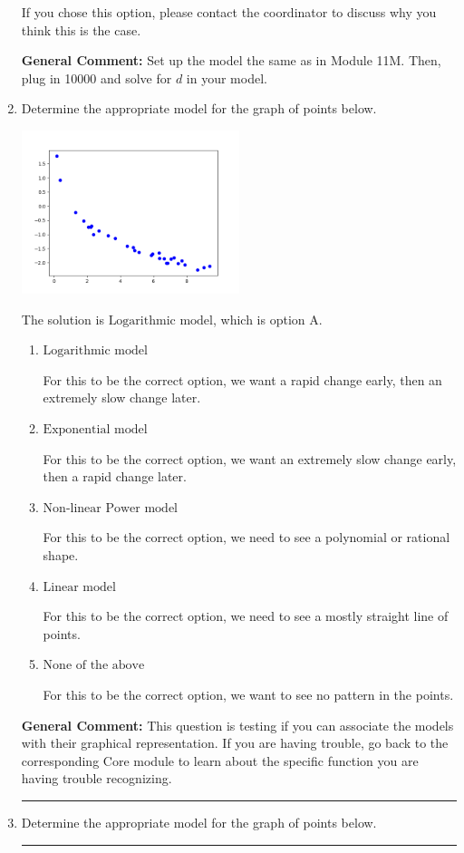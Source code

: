 \documentclass{extbook}[14pt]
\newcommand{\litem}[1]{\item #1

\rule{\textwidth}{0.4pt}}
\begin{document}
\begin{enumerate}
{\begin{enumerate}[label=\Alph*.]
If you chose this option, please contact the coordinator to discuss why you think this is the case.
\end{enumerate}

\textbf{General Comment:} Set up the model the same as in Module 11M. Then, plug in 10000 and solve for $d$ in your model.
}
\litem{
Determine the appropriate model for the graph of points below.

\begin{center}
    \includegraphics[width=0.5\textwidth]{../Figures/identifyModelGraph12CopyA.png}
\end{center}


The solution is \( \text{Logarithmic model} \), which is option A.\begin{enumerate}[label=\Alph*.]
\item \( \text{Logarithmic model} \)

For this to be the correct option, we want a rapid change early, then an extremely slow change later.
\item \( \text{Exponential model} \)

For this to be the correct option, we want an extremely slow change early, then a rapid change later.
\item \( \text{Non-linear Power model} \)

For this to be the correct option, we need to see a polynomial or rational shape.
\item \( \text{Linear model} \)

For this to be the correct option, we need to see a mostly straight line of points.
\item \( \text{None of the above} \)

For this to be the correct option, we want to see no pattern in the points.
\end{enumerate}

\textbf{General Comment:} This question is testing if you can associate the models with their graphical representation. If you are having trouble, go back to the corresponding Core module to learn about the specific function you are having trouble recognizing.
}
\litem{
Determine the appropriate model for the graph of points below.

}
\end{enumerate}
\end{document}
